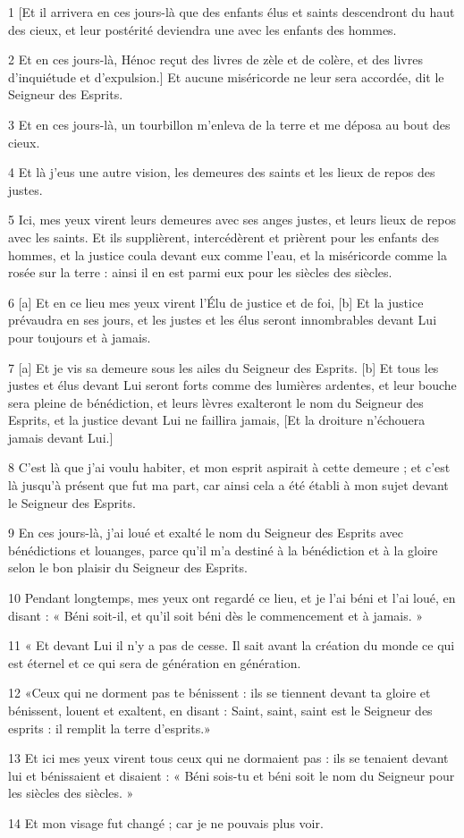
\par 1 [Et il arrivera en ces jours-là que des enfants élus et saints descendront du haut des cieux, et leur postérité deviendra une avec les enfants des hommes.
\par 2 Et en ces jours-là, Hénoc reçut des livres de zèle et de colère, et des livres d'inquiétude et d'expulsion.] Et aucune miséricorde ne leur sera accordée, dit le Seigneur des Esprits.
\par 3 Et en ces jours-là, un tourbillon m'enleva de la terre et me déposa au bout des cieux.
\par 4 Et là j'eus une autre vision, les demeures des saints et les lieux de repos des justes.
\par 5 Ici, mes yeux virent leurs demeures avec ses anges justes, et leurs lieux de repos avec les saints. Et ils supplièrent, intercédèrent et prièrent pour les enfants des hommes, et la justice coula devant eux comme l'eau, et la miséricorde comme la rosée sur la terre : ainsi il en est parmi eux pour les siècles des siècles.
\par 6 [a] Et en ce lieu mes yeux virent l'Élu de justice et de foi, [b] Et la justice prévaudra en ses jours, et les justes et les élus seront innombrables devant Lui pour toujours et à jamais.
\par 7 [a] Et je vis sa demeure sous les ailes du Seigneur des Esprits. [b] Et tous les justes et élus devant Lui seront forts comme des lumières ardentes, et leur bouche sera pleine de bénédiction, et leurs lèvres exalteront le nom du Seigneur des Esprits, et la justice devant Lui ne faillira jamais, [Et la droiture n’échouera jamais devant Lui.]
\par 8 C'est là que j'ai voulu habiter, et mon esprit aspirait à cette demeure ; et c'est là jusqu'à présent que fut ma part, car ainsi cela a été établi à mon sujet devant le Seigneur des Esprits.
\par 9 En ces jours-là, j'ai loué et exalté le nom du Seigneur des Esprits avec bénédictions et louanges, parce qu'il m'a destiné à la bénédiction et à la gloire selon le bon plaisir du Seigneur des Esprits.
\par 10 Pendant longtemps, mes yeux ont regardé ce lieu, et je l'ai béni et l'ai loué, en disant : « Béni soit-il, et qu'il soit béni dès le commencement et à jamais. »
\par 11 « Et devant Lui il n’y a pas de cesse. Il sait avant la création du monde ce qui est éternel et ce qui sera de génération en génération.
\par 12 «Ceux qui ne dorment pas te bénissent : ils se tiennent devant ta gloire et bénissent, louent et exaltent, en disant : Saint, saint, saint est le Seigneur des esprits : il remplit la terre d'esprits.»
\par 13 Et ici mes yeux virent tous ceux qui ne dormaient pas : ils se tenaient devant lui et bénissaient et disaient : « Béni sois-tu et béni soit le nom du Seigneur pour les siècles des siècles. »
\par 14 Et mon visage fut changé ; car je ne pouvais plus voir.

